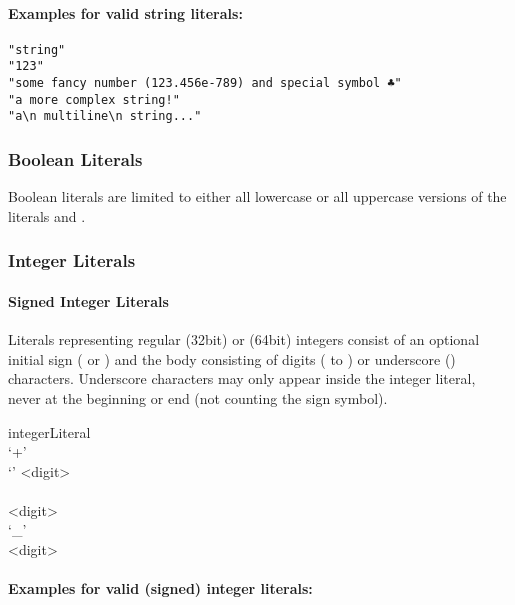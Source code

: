 \documentclass[11pt,a4paper]{article}
\begin{document}
\paragraph{Examples for valid string literals:}

\begin{Verbatim}[samepage=true]
"string"
"123"
"some fancy number (123.456e-789) and special symbol ♣"
"a more complex string!"
"a\n multiline\n string..."
\end{Verbatim}

\subsubsection{Boolean Literals}
\label{sec:boolean-literals}

Boolean literals are limited to either all lowercase or all uppercase versions of the literals  and .

\subsubsection{Integer Literals}
\label{sec:integer-literals}

\paragraph{Signed Integer Literals}
Literals representing regular  (32bit) or  (64bit) integers consist of an optional initial sign (\lit{+} or \lit{-}) and the body consisting of digits ( to ) or underscore (\lit{\_}) characters.
Underscore characters may only appear inside the integer literal, never at the beginning or end (not counting the sign symbol).

\begin{gram}
	\label{gram:integer}
	\begin{rrdiag*}{integerLiteral}
		\sst \\ `+' \\ `\textminus' \est
			<digit> \sst \\ \sst \\ \srp \sst <digit> \\ `\_' \est \\ \erp \est <digit> \est
	\end{rrdiag*}
\end{gram}

\paragraph{Examples for valid (signed) integer literals:}
\end{document}
